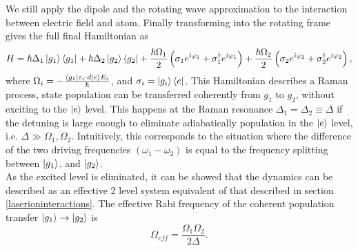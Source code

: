 We still apply the dipole and the rotating wave approximation to the interaction between electric field and atom. Finally transforming into the rotating frame gives the full final Hamiltonian as
\begin{equation}
H = \hbar \Delta_1 \ket{g_1}\bra{g_1} + \hbar\Delta_2 \ket{g_2}\bra{g_2}+ \frac{\hbar \Omega_1}{2}\left(\sigma_1 e^{i\varphi_1} +\sigma_1^\dagger e^{i\varphi_1}\right)+ \frac{\hbar \Omega_2}{2}\left(\sigma_2 e^{i\varphi_2} +\sigma_2^\dagger e^{i\varphi_2}\right),
\end{equation}
where $\Omega_i = -\frac{\braket{g_1|\varepsilon_i \cdot d|e}E_{i}}{\hbar}$, and $\sigma_i = \ket{g_i}\bra{e}$. This Hamiltonian describes a Raman process, state population can be transferred coherently from $g_{1}$ to $g_{2}$, without exciting to the $\ket{e}$ level. This happens at the Raman resonance $\Delta_1 = \Delta_2 \equiv \Delta$ if the detuning is large enough to eliminate adiabatically population in the $\ket{e}$ level, i.e. $\Delta \gg \Omega_1,\Omega_2$. Intuitively, this corresponds to the situation where the difference of the two driving frequencies $(\omega_1-\omega_2)$ is equal to the frequency splitting between $\ket{g_1}$, and $\ket{g_2}$.\\
As the excited level is eliminated, it can be showed \cite{russo} that the dynamics can be described as an effective 2 level system equivalent of that described in section \ref{laserioninteractions}. The effective Rabi frequency of the coherent population transfer $\ket{g_1} \to \ket{g_2}$ is \cite{steck}
\begin{equation}
\label{eq:effectiverabi}
\Omega_{eff} = \frac{\Omega_1\Omega_2}{2\Delta}.
\end{equation}

